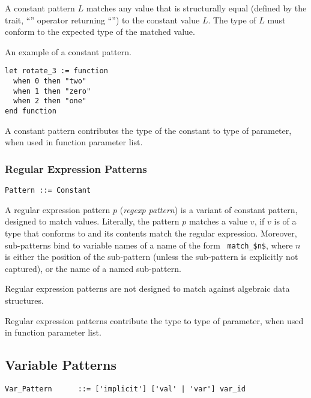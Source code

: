 A constant pattern $L$ matches any value that is structurally equal (defined by the  trait, ``\code{=}'' operator returning ``'') to the constant value $L$. The type of $L$ must conform to the expected type of the matched value. 

\example An example of a constant pattern. 
\begin{lstlisting}
let rotate_3 := function
  when 0 then "two"
  when 1 then "zero"
  when 2 then "one"
end function
\end{lstlisting}

A constant pattern contributes the type of the constant to type of parameter, when used in function parameter list. 





\subsubsection{Regular Expression Patterns}
\label{sec:regexp-patterns}

\grammar\begin{lstlisting}
Pattern ::= Constant
\end{lstlisting}

A regular expression pattern $p$ ({\em regexp pattern}) is a variant of constant pattern, designed to match  values. Literally, the pattern $p$ matches a value $v$, if $v$ is of a type that conforms to  and its contents match the regular expression. Moreover, sub-patterns bind to variable names of a name of the form ~\lstinline!match_$n$!, where $n$ is either the position of the sub-pattern (unless the sub-pattern is explicitly not captured), or the name of a named sub-pattern. 

Regular expression patterns are not designed to match against algebraic data structures. 

Regular expression patterns contribute the  type to type of parameter, when used in function parameter list. 






\subsection{Variable Patterns}
\label{sec:variable-patterns}

\grammar\begin{lstlisting}
Var_Pattern      ::= ['implicit'] ['val' | 'var'] var_id
\end{lstlisting}

